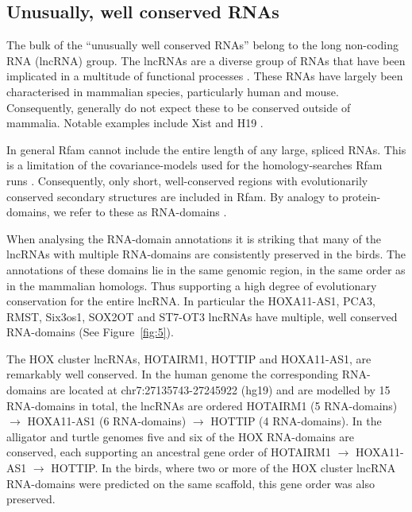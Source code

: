 \documentclass[10pt]{bmc_article}
\newenvironment{bmcformat}{\begin{raggedright}\baselineskip20pt\sloppy\setboolean{publ}{false}}{\end{raggedright}\baselineskip20pt\sloppy}
\begin{document}
\begin{bmcformat}
\subsection*{Unusually, well conserved RNAs}

The bulk of the ``unusually well conserved RNAs'' belong to the long
non-coding RNA (lncRNA) group.  The lncRNAs are a diverse group of
RNAs that have been implicated in a multitude of functional processes
\cite{Rinn:2007,Chow:2005,Guttman:2009}. These RNAs have largely been
characterised in mammalian species, particularly human and
mouse. Consequently, generally do not expect these to be conserved
outside of mammalia. Notable examples include Xist \cite{Duret:2006}
and H19 \cite{Smits:2008}.

In general Rfam cannot include the entire length of any large, spliced
RNAs. This is a limitation of the covariance-models used for the
homology-searches Rfam runs \cite{Nawrocki:2009}. Consequently, only
short, well-conserved regions with evolutionarily conserved secondary
structures are included in Rfam. By analogy to protein-domains, we
refer to these as RNA-domains \cite{Burge:2013}.

When analysing the RNA-domain annotations it is striking that many of
the lncRNAs with multiple RNA-domains are consistently preserved in
the birds. The annotations of these domains lie in the same genomic
region, in the same order as in the mammalian homologs. Thus
supporting a high degree of evolutionary conservation for the entire
lncRNA. In particular the HOXA11-AS1, PCA3, RMST, Six3os1, SOX2OT and
ST7-OT3 lncRNAs have multiple, well conserved RNA-domains (See
Figure~\ref{fig:5}).

The HOX cluster lncRNAs, HOTAIRM1, HOTTIP and HOXA11-AS1, are
remarkably well conserved. In the human genome the corresponding
RNA-domains are located at chr7:27135743-27245922 (hg19) and are
modelled by 15 RNA-domains in total, the %
lncRNAs are ordered HOTAIRM1 (5 RNA-domains) $\rightarrow$ HOXA11-AS1
(6 RNA-domains) $\rightarrow$ HOTTIP (4 RNA-domains). In the alligator
and turtle genomes five and six of the HOX RNA-domains are conserved,
each supporting an ancestral gene order of HOTAIRM1 $\rightarrow$
HOXA11-AS1 $\rightarrow$ HOTTIP. In the birds, where two or more of
the HOX cluster lncRNA RNA-domains were predicted on the same
scaffold, this gene order was also preserved.


\end{bmcformat}
\end{document}
